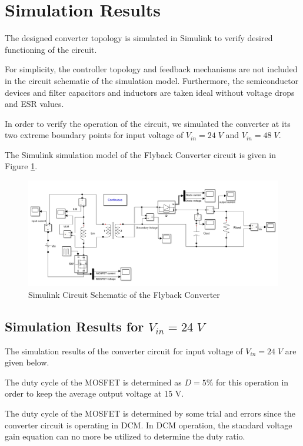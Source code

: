 \section{Simulation Results}
The designed converter topology is simulated in Simulink to verify desired functioning of the circuit.

For simplicity, the controller topology and feedback mechanisms are not included in the circuit schematic of the simulation model. Furthermore, the semiconductor devices and filter capacitors and inductors are taken ideal without voltage drops and ESR values.

In order to verify the operation of the circuit, we simulated the converter at its two extreme boundary points for input voltage of $ V_{in} = 24\;V $ and $ V_{in} = 48\;V $.

The Simulink simulation model of the Flyback Converter circuit is given in Figure \ref{fig:schematic}.

\begin{figure}[H]
\begin{center}
\includegraphics[width=1\textwidth]{schematic.png}
\caption{Simulink Circuit Schematic of the Flyback Converter}
\label{fig:schematic}
\end{center}
\end{figure}

\subsection{Simulation Results for $ V_{in} = 24\;V $}

The simulation results of the converter circuit for input voltage of $ V_{in} = 24\;V $ are given below.

The duty cycle of the MOSFET is determined as $ D = 5\% $ for this operation in order to keep the average output voltage at 15 V.

The duty cycle of the MOSFET is determined by some trial and errors since the converter circuit is operating in DCM. In DCM operation, the standard voltage gain equation can no more be utilized to determine the duty ratio.

